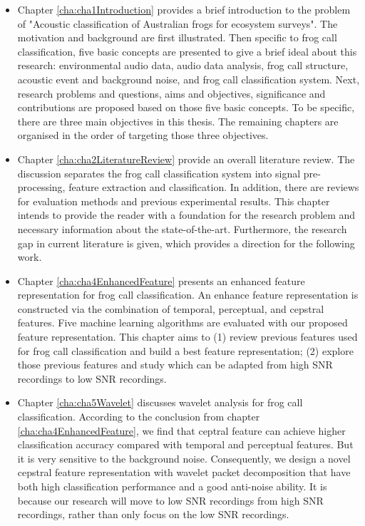 \begin{itemize}
\item  Chapter \ref{cha:cha1Introduction} provides a brief introduction to the problem of "Acoustic classification of Australian frogs for ecosystem surveys". The motivation and background are first illustrated. Then specific to frog call classification, five basic concepts are presented to give a brief ideal about this research: environmental audio data, audio data analysis, frog call structure, acoustic event and background noise, and frog call classification system. Next, research problems and questions, aims and objectives, significance and contributions are proposed based on those five basic concepts. To be specific, there are three main objectives in this thesis. The remaining chapters are organised in the order of targeting those three objectives.

\item Chapter \ref{cha:cha2LiteratureReview} provide an overall literature review. The discussion separates the frog call classification system into signal pre-processing, feature extraction and classification. In addition, there are reviews for evaluation methods and previous experimental results. This chapter intends to provide the reader with a foundation for the research problem and necessary information about the state-of-the-art. Furthermore, the research gap in current literature is given, which provides a direction for the following work.


\item Chapter \ref{cha:cha4EnhancedFeature} presents an enhanced feature representation for frog call classification. An enhance feature representation is constructed via the combination of temporal, perceptual, and cepstral features. Five machine learning algorithms are evaluated with our proposed feature representation. This chapter aims to (1) review previous features used for frog call classification and build a best feature representation; (2) explore those previous features and study which can be adapted from high SNR recordings to low SNR recordings.


\item  Chapter \ref{cha:cha5Wavelet} discusses wavelet analysis for frog call classification. According to the conclusion from chapter \ref{cha:cha4EnhancedFeature}, we find that ceptral feature can achieve higher classification accuracy compared with temporal and perceptual features. But it is very sensitive to the background noise. Consequently, we design a novel cepstral feature representation with wavelet packet decomposition that have both high classification performance and a good anti-noise ability. It is because our research will move to low SNR recordings from high SNR recordings, rather than only focus on the low SNR recordings.



\end{itemize}
